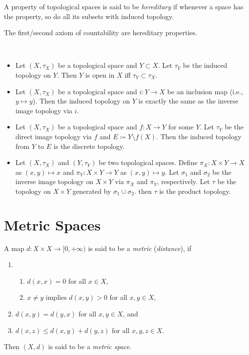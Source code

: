 \documentclass{techreport}
\begin{document}
\begin{definition}
	A property of topological spaces is said to be \emph{hereditary} if whenever a space has the property, so do all its subsets with induced topology.
\end{definition}

\begin{remark}
	The first/second axiom of countability are hereditary properties.
\end{remark}

\begin{remark}\
	\begin{itemize}
		\item Let $(X,\tau_X)$ be a topological space and $Y \subset X$.
		Let $\tau_Y$ be the induced topology on $Y$.
		Then $Y$ is open in $X$ iff $\tau_Y \subset \tau_X$.
		\item Let $(X,\tau_X)$ be a topological space and $i : Y \to X$ be an inclusion map (i.e., $y \mapsto y$).
		Then the induced topology on $Y$ is exactly the same as the inverse image topology via $i$.
		\item Let $(X,\tau_X)$ be a topological space and $f : X\to Y$ for some $Y$.
		Let $\tau_Y$ be the direct image topology via $f$ and $E \coloneqq Y \setminus f(X)$.
		Then the induced topology from $Y$ to $E$ is the discrete topology.
		\item Let $(X,\tau_X)$ and $(Y,\tau_Y)$ be two topological spaces.
		Define $\pi_X : X \times Y \to X$ as $(x,y) \mapsto x$ and $\pi_Y : X \times Y \to Y$ as $(x,y) \mapsto y$.
		Let $\sigma_1$ and $\sigma_2$ be the inverse image topology on $X \times Y$ via $\pi_X$ and $\pi_Y$, respectively.
		Let $\tau$ be the topology on $X \times Y$ generated by $\sigma_1 \cup \sigma_2$.
		then $\tau$ is the product topology.
	\end{itemize}	
\end{remark}

\section{Metric Spaces}

\begin{definition}
	A map $d : X \times X \to [0,+\infty)$ is said to be a \emph{metric} (\emph{distance}), if
	\begin{enumerate}
		\item 
		\begin{enumerate}
			\item $d(x,x) = 0$ for all $x \in X$,
			\item $x \neq y$ implies $d(x,y) > 0$ for all $x,y \in X$,
		\end{enumerate}
		\item $d(x,y) = d(y,x)$ for all $x,y \in X$, and
		\item $d(x,z) \le d(x,y) + d(y,z)$ for all $x,y,z \in X$.
	\end{enumerate}
	Then $(X,d)$ is said to be a \emph{metric space}.
\end{definition}
\end{document}
